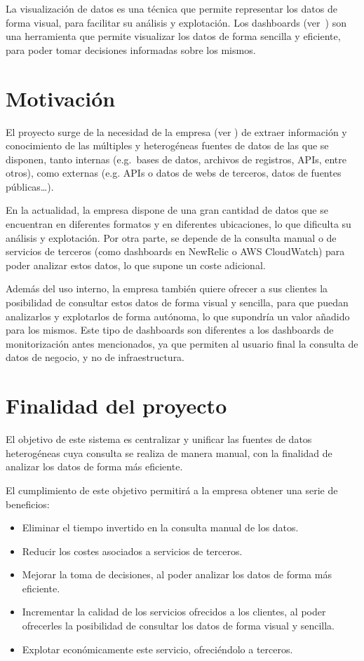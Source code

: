 La visualización de datos es una técnica que permite representar los datos de forma visual, para
facilitar su análisis y explotación. Los dashboards (ver~) son una
herramienta que permite visualizar los datos de forma sencilla y eficiente, para poder tomar
decisiones informadas sobre los mismos.

\newpage{}

\section{Motivación}\label{sec:motivacion}
El proyecto surge de la necesidad de la empresa (ver ) de extraer información
y conocimiento de las múltiples y heterogéneas fuentes de datos de las que se disponen,
tanto internas (e.g.~bases de datos, archivos de registros, APIs, entre otros),
como externas (e.g. APIs o datos de webs de terceros, datos de fuentes públicas\ldots).

En la actualidad, la empresa dispone de una gran cantidad de datos que se encuentran en
diferentes formatos y en diferentes ubicaciones, lo que dificulta su análisis y explotación.
Por otra parte, se depende de la consulta manual o de servicios de terceros (como dashboards
en NewRelic o AWS CloudWatch) para poder analizar estos datos, lo que supone un coste adicional.

Además del uso interno, la empresa también quiere ofrecer a sus clientes la posibilidad de
consultar estos datos de forma visual y sencilla, para que puedan analizarlos y explotarlos de
forma autónoma, lo que supondría un valor añadido para los mismos. Este tipo de dashboards
son diferentes a los dashboards de monitorización antes mencionados, ya que permiten al usuario
final la consulta de datos de negocio, y no de infraestructura.

\section{Finalidad del proyecto}\label{sec:finalidad}
El objetivo de este sistema es centralizar y unificar las fuentes de datos heterogéneas
cuya consulta se realiza de manera manual, con la finalidad de analizar los datos de forma
más eficiente.

El cumplimiento de este objetivo permitirá a la empresa obtener una serie de beneficios:
\begin{itemize}
	\item Eliminar el tiempo invertido en la consulta manual de los datos.
	\item Reducir los costes asociados a servicios de terceros.
	\item Mejorar la toma de decisiones, al poder analizar los datos de forma más eficiente.
	\item Incrementar la calidad de los servicios ofrecidos a los clientes, al poder ofrecerles
	      la posibilidad de consultar los datos de forma visual y sencilla.
	\item Explotar económicamente este servicio, ofreciéndolo a terceros.
\end{itemize}

